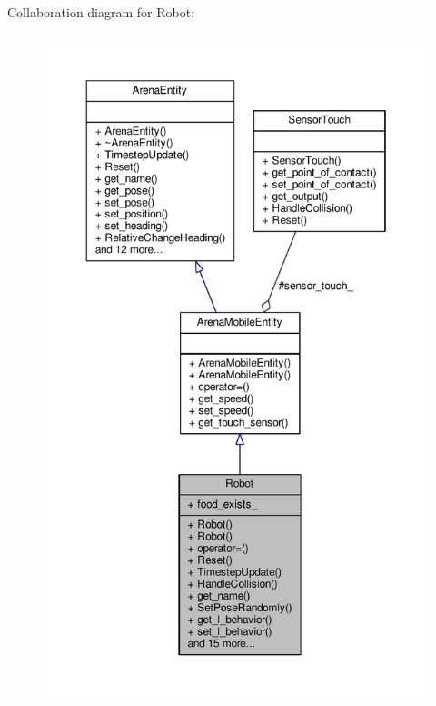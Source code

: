 Collaboration diagram for Robot\+:\nopagebreak
\begin{figure}[H]
\begin{center}
\leavevmode
\includegraphics[height=550pt]{classRobot__coll__graph}
\end{center}
\end{figure}
